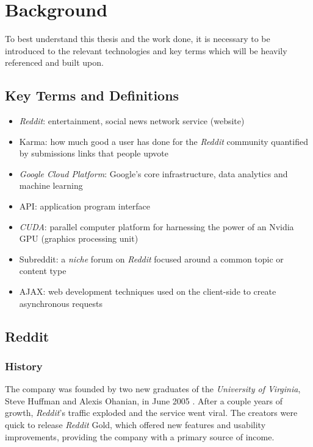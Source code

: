 \documentclass[msc,oneside]{ubcthesis}%
\begin{document}
\chapter{Background}
To best understand this thesis and the work done, it is necessary to be introduced to the relevant technologies and key terms which will be heavily referenced and built upon.

\section{Key Terms and Definitions}
\begin{itemize}
\item{\textit{Reddit}: entertainment, social news network service (website)}
\item{Karma: how much good a user has done for the \textit{Reddit} community quantified by submissions links that people upvote}
\item{\textit{Google Cloud Platform}: Google's core infrastructure, data analytics and machine learning}
\item{API: application program interface}
\item{\textit{CUDA}: parallel computer platform for harnessing the power of an Nvidia GPU (graphics processing unit)}
\item{Subreddit: a \textit{niche} forum on \textit{Reddit} focused around a common topic or content type}
\item{AJAX: web development techniques used on the client-side to create asynchronous requests}
\end{itemize}

\section{Reddit}

\subsection{History}
The company was founded by two new graduates of the \textit{University of Virginia}, Steve Huffman and Alexis Ohanian, in June 2005 \citep{Guardian}. After a couple years of growth, \textit{Reddit}'s traffic exploded and the service went viral. The creators were quick to release \textit{Reddit} Gold, which offered new features and usability improvements, providing the company with a primary source of income.
\end{document}
